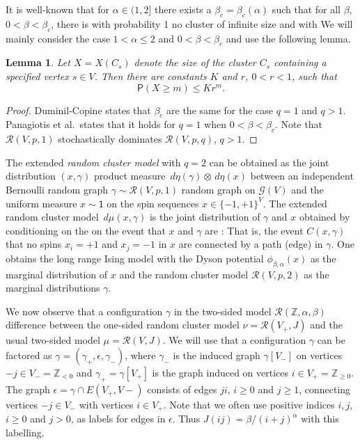 \documentclass[11pt, a4paper]{amsart}
\newtheorem{lem}[thm]{Lemma}
\theoremstyle{definition}
\theoremstyle{remark}
\renewcommand{\d}{\,d}
\providecommand{\ZZ}{\mathbb{Z}}
\providecommand{\mscr}{\mathscr}
\renewcommand{\P}{\mathsf{P}}
\providecommand{\ett}{\mathsf{1}}
\providecommand{\e}{\epsilon}
\providecommand{\g}{\gamma}
\begin{document}
It is well-known that for $\alpha\in(1,2]$ 
there exists a $\beta_c=\beta_c(\alpha)$ 
such that for all $\beta$, $0<\beta<\beta_c$, 
there is with probability 1 no cluster of infinite size and with   
We will mainly consider the case $1<\alpha\le 2$ and $0<\beta <\beta_c$ and use the following lemma. 
\begin{lem}\label{geometric-bound}
 Let $X=X(C_s)$ denote the size of the cluster $C_s$ 
 containing a specified vertex $s\in V$. Then there are constants 
 $K$ and $r$, $0<r<1$, such that $$\P(X\ge m)\le K r^{m}. $$ 
\end{lem}
\begin{proof}
Duminil-Copine states that $\beta_c$ are the same for the case $q=1$ and $q>1$. 
Panagiotis et al.\ states that it holds for $q=1$ when $0<\beta<\beta_c$. 
Note that $\mscr R(V,p,1)$ stochastically dominates $\mscr R(V,p,q)$, $q>1$. 
\end{proof}

The extended \emph{random cluster model} with $q=2$ 
can be obtained as the joint distribution $(x,\gamma)$
product measure $\d\eta(\g) \otimes \d\eta(x)$ between an independent
Bernoulli random graph $\g\sim\mscr R(V,p,1)$ random graph on $\mscr G(V)$ and the
uniform measure $x\sim\ett$ on the spin sequences $x\in\{-1,+1\}^{V}$. The
extended random cluster model $\d\mu(x,\g)$ is the joint distribution of $\g$
and $x$ obtained by conditioning on the on the event that $x$ and $\g$ are
: 
That is, the event $C(x,\g)$ that no spins $x_i=+1$ and $x_j=-1$ in
$x$ are connected by a path (edge) in $\g$. One obtains the long range 
Ising model with the Dyson potential $\phi_{\beta,\alpha}(x)$ as the marginal distribution of $x$ and the random cluster model $\mscr R(V,p,2)$ as the marginal distributions $\g$. 

We now observe that a configuration $\g$ in the two-sided model $\mscr R(\ZZ,\alpha,\beta)$
difference between the one-sided random cluster model $\nu = \mscr R(V_+,J)$ and
the usual two-sided model $\mu = \mscr R(V,J)$. We will use that a configuration
$\g$ can be factored as $\g = (\g_+, \e, \g_-)$, where $\g_-$ is the induced
graph $\g[V_-]$ on vertices $-j\in V_-=\ZZ_{<0}$ and $\g_+=\g[V_+]$ is the graph
induced on vertices $i\in V_+=\ZZ_{\ge0}$. The graph $\e=\g\cap E(V_+,V-)$
consists of edges $ji$, $i\ge0$ and $j\ge 1$, connecting vertices $-j\in V_-$
with vertices $i\in V_+$. Note that we often use positive indices $i,j$, $i\ge0$
and $j>0$, as labels for edges in $\e$. Thus $J(ij)=\beta/(i+j)^\alpha$ with
this labelling.
\end{document}
